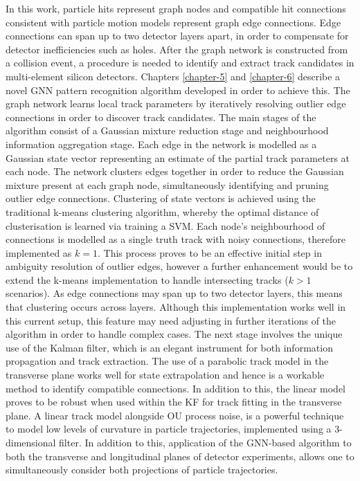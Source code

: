 
In this work, particle hits represent graph nodes and compatible hit connections consistent with particle motion models represent graph edge connections. Edge connections can span up to two detector layers apart, in order to compensate for detector inefficiencies such as holes. After the graph network is constructed from a collision event, a procedure is needed to identify and extract track candidates in multi-element silicon detectors. Chapters \ref{chapter-5} and \ref{chapter-6} describe a novel GNN pattern recognition algorithm developed in order to achieve this. The graph network learns local track parameters by iteratively resolving outlier edge connections in order to discover track candidates. 
The main stages of the algorithm consist of a Gaussian mixture reduction stage and neighbourhood information aggregation stage. Each edge in the network is modelled as a Gaussian state vector representing an estimate of the partial track parameters at each node. The network clusters edges together in order to reduce the Gaussian mixture present at each graph node, simultaneously identifying and pruning outlier edge connections. Clustering of state vectors is achieved using the traditional k-means clustering algorithm, whereby the optimal distance of clusterisation is learned via training a SVM. Each node’s neighbourhood of connections is modelled as a single truth track with noisy connections, therefore implemented as $k = 1$. This process proves to be an effective initial step in ambiguity resolution of outlier edges, however a further enhancement would be to extend the k-means implementation to handle intersecting tracks ($k > 1$ scenarios). As edge connections may span up to two detector layers, this means that clustering occurs across layers. Although this implementation works well in this current setup, this feature may need adjusting in further iterations of the algorithm in order to handle complex cases.
The next stage involves the unique use of the Kalman filter, which is an elegant instrument for both information propagation and track extraction. The use of a parabolic track model in the transverse plane works well for state extrapolation and hence is a workable method to identify compatible connections. In addition to this, the linear model proves to be robust when used within the KF for track fitting in the transverse plane. A linear track model alongside OU process noise, is a powerful technique to model low levels of curvature in particle trajectories, implemented using a 3-dimensional filter. In addition to this, application of the GNN-based algorithm to both the transverse and longitudinal planes of detector experiments, allows one to simultaneously consider both projections of particle trajectories.
